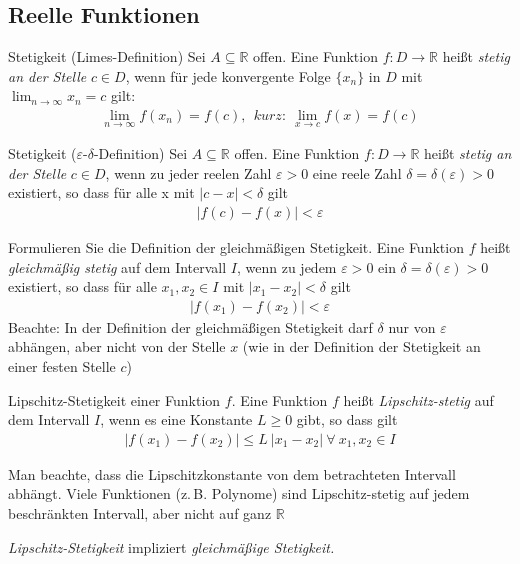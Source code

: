 \subsection{Reelle Funktionen}
\begin{karte}{Stetigkeit (Limes-Definition)}
	Sei \(A\subseteq\mathbb{R}\) offen. Eine Funktion \(f:D\to\mathbb{R}\) heißt \emph{stetig an der Stelle} \(c \in D\), wenn für jede konvergente Folge \(\{ x_{n} \} \) in \(D\) mit \(\displaystyle\lim_{n\to\infty} x_n = c\) gilt:
	\begin{align}
		\lim_{n\to\infty} f(x_n)=f(c),\ \ kurz:\ \lim_{x\to c}f(x)=f(c)
	\end{align}
\end{karte}

\begin{karte}{Stetigkeit (\(\varepsilon\text{-}\delta \)-Definition)}
	Sei \(A\subseteq\mathbb{R}\) offen. Eine Funktion \(f:D\to\mathbb{R}\) heißt \emph{stetig an der Stelle} \(c \in D\), wenn zu jeder reelen Zahl \(\varepsilon > 0\) eine reele Zahl \(\delta=\delta(\varepsilon)>0\) existiert, so dass für alle x mit \(|c-x|<\delta \) gilt
	\begin{align}
		|f(c)-f(x)|<\varepsilon
	\end{align}

\end{karte}

\begin{karte}{Formulieren Sie die Definition der gleichmäßigen Stetigkeit.}
	Eine Funktion $f$ heißt \emph{gleichmäßig stetig} auf dem Intervall $I$, wenn zu jedem $\varepsilon > 0$ ein $\delta = \delta(\varepsilon) > 0$ existiert, so dass für alle $x_1,x_2 \in I$ mit $\lvert x_1 - x_2 \rvert < \delta $ gilt
	\begin{align}
		\lvert f(x_1) - f(x_2) \rvert<\varepsilon
	\end{align}
	{\large
		Beachte: In der Definition der gleichmäßigen Stetigkeit darf $\delta$ nur von $\varepsilon$ abhängen, aber nicht von der Stelle $x$ (wie in der Definition der Stetigkeit an einer festen Stelle $c$)
	}
\end{karte}


\begin{karte}{Lipschitz-Stetigkeit einer Funktion \(f\).}%
	Eine Funktion \(f\) heißt \emph{Lipschitz-stetig} auf dem Intervall \(I\), wenn es eine Konstante \(L\geq0\) gibt, so dass gilt
	\begin{align}
		\lvert f(x_1) - f(x_2) \rvert\leq L\ \lvert x_1 - x_2 \rvert\  \forall \  x_1,x_2\in I
	\end{align}
	{\large Man beachte, dass die Lipschitzkonstante von dem betrachteten Intervall abhängt. Viele Funktionen (z.\,B. Polynome) sind Lipschitz-stetig auf jedem beschränkten Intervall, aber nicht auf ganz $\mathbb{R}$\par}
	\vspace{5mm}
	\emph{Lipschitz-Stetigkeit} impliziert \emph{gleichmäßige Stetigkeit.}

\end{karte}

